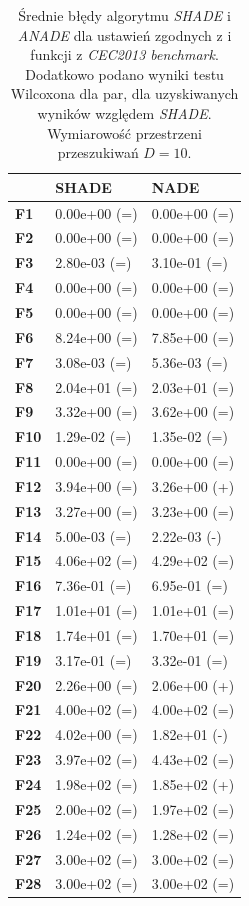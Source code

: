 \documentclass[12pt,a4paper]{report}
\begin{document}
{{{{{{{\begin{table}[h]
\centering
\caption{Średnie błędy algorytmu \emph{SHADE} i \emph{ANADE} dla ustawień zgodnych z \cite{SHADE} i funkcji z \emph{CEC2013 benchmark}. Dodatkowo podano wyniki testu Wilcoxona dla par, dla uzyskiwanych wyników względem \emph{SHADE}. Wymiarowość przestrzeni przeszukiwań $D = 10$.}
\label{FullEksp210}
\begin{tabular}{|l|l|l|}
\hline
          & {\bf SHADE}  & {\bf NADE}   \\ \hline
{\bf F1}  & 0.00e+00 (=) & 0.00e+00 (=) \\ \hline
{\bf F2}  & 0.00e+00 (=) & 0.00e+00 (=) \\ \hline
{\bf F3}  & 2.80e-03 (=) & 3.10e-01 (=) \\ \hline
{\bf F4}  & 0.00e+00 (=) & 0.00e+00 (=) \\ \hline
{\bf F5}  & 0.00e+00 (=) & 0.00e+00 (=) \\ \hline
{\bf F6}  & 8.24e+00 (=) & 7.85e+00 (=) \\ \hline
{\bf F7}  & 3.08e-03 (=) & 5.36e-03 (=) \\ \hline
{\bf F8}  & 2.04e+01 (=) & 2.03e+01 (=) \\ \hline
{\bf F9}  & 3.32e+00 (=) & 3.62e+00 (=) \\ \hline
{\bf F10} & 1.29e-02 (=) & 1.35e-02 (=) \\ \hline
{\bf F11} & 0.00e+00 (=) & 0.00e+00 (=) \\ \hline
{\bf F12} & 3.94e+00 (=) & 3.26e+00 (+) \\ \hline
{\bf F13} & 3.27e+00 (=) & 3.23e+00 (=) \\ \hline
{\bf F14} & 5.00e-03 (=) & 2.22e-03 (-) \\ \hline
{\bf F15} & 4.06e+02 (=) & 4.29e+02 (=) \\ \hline
{\bf F16} & 7.36e-01 (=) & 6.95e-01 (=) \\ \hline
{\bf F17} & 1.01e+01 (=) & 1.01e+01 (=) \\ \hline
{\bf F18} & 1.74e+01 (=) & 1.70e+01 (=) \\ \hline
{\bf F19} & 3.17e-01 (=) & 3.32e-01 (=) \\ \hline
{\bf F20} & 2.26e+00 (=) & 2.06e+00 (+) \\ \hline
{\bf F21} & 4.00e+02 (=) & 4.00e+02 (=) \\ \hline
{\bf F22} & 4.02e+00 (=) & 1.82e+01 (-) \\ \hline
{\bf F23} & 3.97e+02 (=) & 4.43e+02 (=) \\ \hline
{\bf F24} & 1.98e+02 (=) & 1.85e+02 (+) \\ \hline
{\bf F25} & 2.00e+02 (=) & 1.97e+02 (=) \\ \hline
{\bf F26} & 1.24e+02 (=) & 1.28e+02 (=) \\ \hline
{\bf F27} & 3.00e+02 (=) & 3.00e+02 (=) \\ \hline
{\bf F28} & 3.00e+02 (=) & 3.00e+02 (=) \\ \hline
\end{tabular}
\end{table}

}}}}}}}
\end{document}
